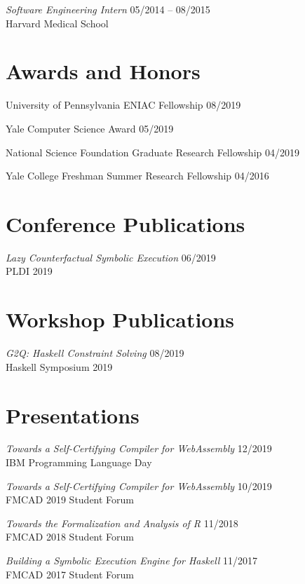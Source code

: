 \documentclass[margin]{res}
\begin{document}
\begin{resume}
\textit{Software Engineering Intern} \hfill 05/2014 -- 08/2015 \\
Harvard Medical School


\section{Awards and Honors}
University of Pennsylvania ENIAC Fellowship \hfill 08/2019

Yale Computer Science Award \hfill 05/2019

National Science Foundation Graduate Research Fellowship \hfill 04/2019

Yale College Freshman Summer Research Fellowship \hfill 04/2016


\section{Conference Publications}
\textit{Lazy Counterfactual Symbolic Execution} \hfill 06/2019 \\
PLDI 2019

\section{Workshop Publications}

\textit{G2Q: Haskell Constraint Solving} \hfill 08/2019 \\
Haskell Symposium 2019


\section{Presentations}
\textit{Towards a Self-Certifying Compiler for WebAssembly} \hfill 12/2019 \\
  IBM Programming Language Day

\textit{Towards a Self-Certifying Compiler for WebAssembly} \hfill 10/2019 \\
  FMCAD 2019 Student Forum

\textit{Towards the Formalization and Analysis of R} \hfill 11/2018 \\
  FMCAD 2018 Student Forum

\textit{Building a Symbolic Execution Engine for Haskell} \hfill 11/2017 \\
  FMCAD 2017 Student Forum


\end{resume}
\end{document}
